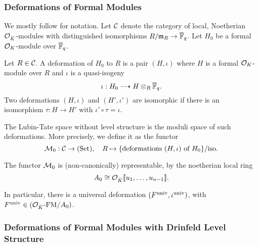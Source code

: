 \subsubsection{Deformations of Formal Modules} %
\label{subsub:Deformations of Formal Modules}
We mostly follow \cite[Chapter 2]{Strauch2008DefSp} for notation. Let $\mathcal{C}$
denote the category of local, Noetherian $\mathcal{O}_{\breve {K}}$-modules with distinguished
isomorphisms $R/\mathfrak{m}_R \to \overline {\mathbb{F}}_q$. Let $H_0$ be a formal $\mathcal{O}_K$-module 
over $\overline {\mathbb{F}}_q$. 
\begin{defi}[Deformation]
  Let $R \in \mathcal{C}$. A deformation of $H_0$ to $R$ is a pair $(H, \iota)$ where
  $H$ is a formal $\mathcal{O}_K$-module over $R$ and $\iota$ is a quasi-isogeny
  \begin{equation*}
    \iota: H_0 \dashrightarrow H \otimes_R {\overline {\mathbb{F}}_q}.
  \end{equation*}
  Two deformations $(H, \iota)$ and $(H', \iota')$ are isomorphic if there is
  an isomorphism $\tau: H \to H'$ with $\iota' \circ \tau = \iota$. 
\end{defi}
The Lubin-Tate space without level structure is the moduli space of such deformations.
More precisely, we define it as the functor
\begin{equation*}
  \mathcal{M}_0: \mathcal{C} \to {(\mathrm{Set})}, \quad R \mapsto \{\text{deformations } (H, \iota) \text{
  of $H_0$}\}/\text{iso}.
\end{equation*}

\begin{thm}[Representability of $\cM_0$]
  The functor $\cM_0$ is (non-canonically) representable, by the noetherian
  local ring
  \begin{equation*}
    A_0 \cong \mathcal{O}_{\breve {K}}\llbracket u_1, \dots, u_{n-1} \rrbracket.
  \end{equation*}
\end{thm}
In particular, there is a universal deformation
$(F^{\mathrm{univ}}, \iota^{\mathrm{univ}})$, with $F^{\mathrm{univ}} \in {({\mathcal{O}_{\breve {K}}}\text-\mathrm{FM}/{A_0})}$.

\subsubsection{Deformations of Formal Modules with Drinfeld Level Structure} 

